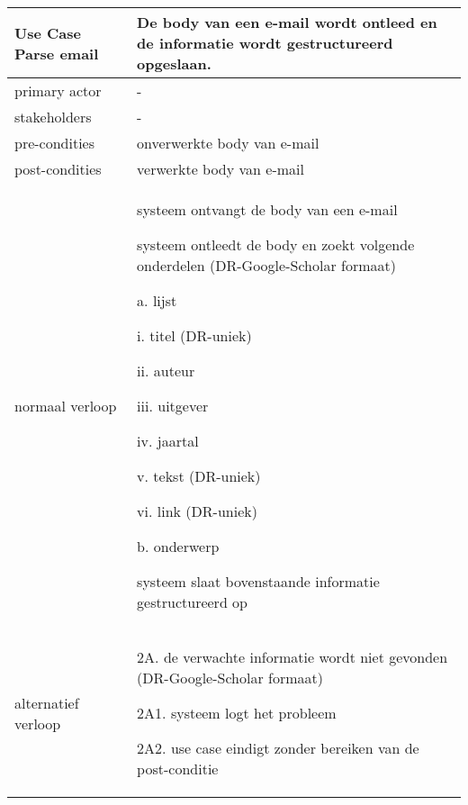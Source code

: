 \newpage
\begin{table}[ptb]
    \centering
    \begin{tabular}{ | m{5cm} | m{10cm}| } 
        \hline
        \rowcolor{lightgray}
        Use Case Parse email & De body van een e-mail wordt ontleed en de informatie wordt gestructureerd opgeslaan. \\ 
        \hline
        primary actor & - \\ 
        \hline
        stakeholders & - \\ 
        \hline
        pre-condities & onverwerkte body van e-mail \\ 
        \hline
        post-condities & verwerkte body van e-mail \\ 
        \hline
        normaal verloop & 
        \begin{enumerate}
            \item systeem ontvangt de body van een e-mail
            \item systeem ontleedt de body en zoekt volgende onderdelen (DR-Google-Scholar formaat)
            \begin{description}
                \item a. lijst
                \begin{description}
                    \item i. titel (DR-uniek)
                    \item ii. auteur
                    \item iii. uitgever
                    \item iv. jaartal
                    \item v. tekst (DR-uniek)
                    \item vi. link (DR-uniek)
                \end{description}
                \item b. onderwerp
            \end{description}
            \item systeem slaat bovenstaande informatie gestructureerd op
        \end{enumerate} \\ 
        \hline
        alternatief verloop & 
        \begin{description}
            \item 2A. de verwachte informatie wordt niet gevonden (DR-Google-Scholar formaat)
            \item 2A1. systeem logt het probleem
            \item 2A2. use case eindigt zonder bereiken van de post-conditie

\end{description}
\end{tabular}
\end{table}
